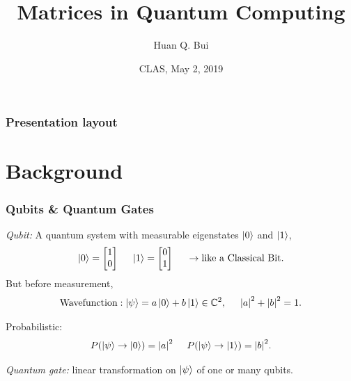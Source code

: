 \documentclass{beamer}
\title{Matrices in Quantum Computing}
\author[Huan Q. Bui] %
{Huan Q. Bui}
\institute[Colby College] %
{
	
	Matrix Analysis
	\and
	Professor Leo Livshits
}
\date{CLAS, May 2, 2019}
\theoremstyle{definition}
\begin{document}
 
\frame{\titlepage}
 
\begin{frame}
\frametitle{Presentation layout}
\tableofcontents
\end{frame}



\section{Background}



\begin{frame}
\frametitle{Qubits \& Quantum Gates}
\textit{Qubit:} A quantum system with measurable eigenstates $\left\vert{0}\right\rangle$ and $\left\vert{1}\right\rangle$,
\begin{align*}
\left\vert{0}\right\rangle = \begin{bmatrix}
1\\0
\end{bmatrix}\hspace{0.5cm} \left\vert{1}\right\rangle = \begin{bmatrix}
0\\1
\end{bmatrix} \hspace{0.5cm} \rightarrow \text{like a Classical Bit.}
\end{align*}
But before measurement,
\begin{align*}
\text{Wavefunction}: \left\vert{\psi}\right\rangle = a\left\vert{0}\right\rangle + b\left\vert{1}\right\rangle \in \mathbb{C}^2,\hspace{0.5cm} \abs{a}^2 + \abs{b}^2 = 1.
\end{align*}

Probabilistic:
\begin{align*}
P(\left\vert{\psi}\right\rangle \to \left\vert{0}\right\rangle) = \abs{a}^2\hspace{0.5cm}
P(\left\vert{\psi}\right\rangle \to \left\vert{1}\right\rangle) = \abs{b}^2.
\end{align*}

\textit{Quantum gate:} linear transformation on $\left\vert{\psi}\right\rangle$ of one or many qubits. 
\end{frame}
\end{document}
